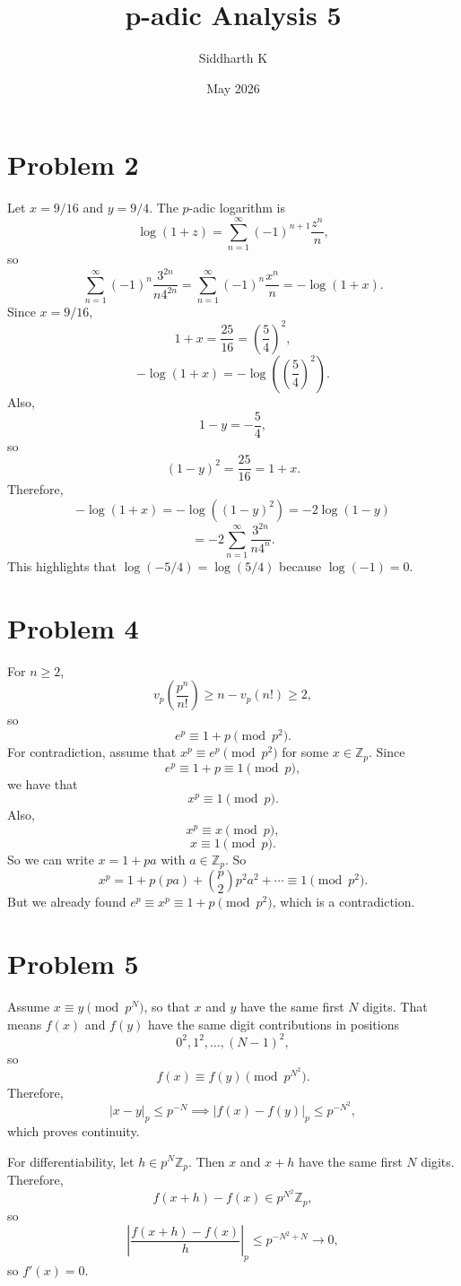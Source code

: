 \documentclass{article}
\title{p-adic Analysis 5}
\author{Siddharth K}
\date{May 2026}
\newcommand{\Z}{\mathbb{Z}}
\newcommand{\bigp}[1]{\left(#1\right)}
\newcommand{\bigabs}[1]{\left|#1\right|}
\begin{document}
\maketitle

\section*{Problem 2}
Let $x = 9/16$ and $y = 9/4$. The $p$-adic logarithm is
$$\log(1 + z) = \sum_{n = 1}^\infty (-1)^{n + 1} \frac{z^n}{n},$$
so
$$\sum_{n = 1}^\infty (-1)^n \frac{3^{2n}}{n4^{2n}} = \sum_{n = 1}^\infty (-1)^n \frac{x^n}{n} = -\log(1 + x).$$
Since $x = 9/16$,
$$1 + x = \frac{25}{16} = \bigp{\frac{5}{4}}^2,$$
$$-\log(1 + x) = -\log\bigp{\bigp{\frac{5}{4}}^2}.$$
Also,
$$1 - y = -\frac 54,$$
so
$$(1 - y)^2 = \frac{25}{16} = 1 + x.$$
Therefore,
$$-\log(1 + x) = -\log((1 - y)^2) = -2\log(1 - y)$$
$$= -2\sum_{n = 1}^\infty \frac{3^{2n}}{n4^n}.$$
This highlights that $\log(-5/4) = \log(5/4)$ because $\log(-1) = 0$.

\section*{Problem 4}
For $n \ge 2$,
$$v_p\bigp{\frac{p^n}{n!}} \ge n - v_p(n!) \ge 2,$$
so
$$e^p \equiv 1 + p \pmod{p^2}.$$
For contradiction, assume that $x^p \equiv e^p \pmod{p^2}$ for some $x \in \Z_p$. Since
$$e^p \equiv 1 + p \equiv 1 \pmod{p},$$
we have that
$$x^p \equiv 1 \pmod{p}.$$
Also,
$$x^p \equiv x \pmod{p},$$
$$x \equiv 1 \pmod{p}.$$
So we can write $x = 1 + pa$ with $a \in \Z_p$. So
$$x^p = 1 + p(pa) + \binom{p}{2}p^2a^2 + \cdots \equiv 1 \pmod{p^2}.$$
But we already found $e^p \equiv x^p \equiv 1 + p \pmod{p^2}$, which is a contradiction.

\section*{Problem 5}
Assume $x \equiv y \pmod{p^N}$, so that $x$ and $y$ have the same first $N$ digits. That means $f(x)$ and $f(y)$ have the same digit contributions in positions
$$0^2, 1^2, \ldots, (N - 1)^2,$$
so
$$f(x) \equiv f(y) \pmod{p^{N^2}}.$$
Therefore,
$$|x - y|_p \le p^{-N} \implies |f(x) - f(y)|_p \le p^{-N^2},$$
which proves continuity.

For differentiability, let $h \in p^N\Z_p$. Then $x$ and $x + h$ have the same first $N$ digits. Therefore,
$$f(x + h) - f(x) \in p^{N^2}\Z_p,$$
so
$$\bigabs{\frac{f(x + h) - f(x)}{h}}_p \le p^{-N^2 + N} \to 0,$$
so $f'(x) = 0$.
\end{document}
